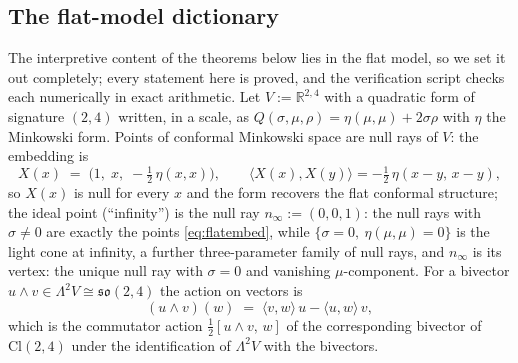 \documentclass[11pt]{article}
\theoremstyle{definition}
\newcommand{\Cl}{\mathrm{Cl}}
\newcommand{\R}{\mathbb{R}}
\newcommand{\nInf}{n_\infty}
\newcommand{\ip}[2]{\langle #1, #2\rangle}
\begin{document}
\subsection{The flat-model dictionary}\label{subsec:flatmodel}

The interpretive content of the theorems below lies in the flat model, so we set it out completely; every statement here is proved, and the verification script checks each numerically in exact arithmetic. Let $V := \R^{2,4}$ with a quadratic form of signature $(2,4)$ written, in a scale, as $Q(\sigma,\mu,\rho) = \eta(\mu,\mu) + 2\sigma\rho$ with $\eta$ the Minkowski form. Points of conformal Minkowski space are null rays of $V$: the embedding is
\begin{equation}\label{eq:flatembed}
X(x) \;=\; \bigl(1,\; x,\; -\tfrac12\,\eta(x,x)\bigr), \qquad
\ip{X(x)}{X(y)} = -\tfrac12\,\eta(x - y,\, x - y),
\end{equation}
so $X(x)$ is null for every $x$ and the form recovers the flat conformal structure; the ideal point (``infinity'') is the null ray $\nInf := (0, 0, 1)$: the null rays with $\sigma \neq 0$ are exactly the points \eqref{eq:flatembed}, while $\{\sigma = 0,\ \eta(\mu,\mu) = 0\}$ is the light cone at infinity, a further three-parameter family of null rays, and $\nInf$ is its vertex: the unique null ray with $\sigma = 0$ and vanishing $\mu$-component. For a bivector $u \wedge v \in \Lambda^2 V \cong \mathfrak{so}(2,4)$ the action on vectors is
\begin{equation}\label{eq:bivectoraction}
(u \wedge v)(w) \;=\; \ip{v}{w}\,u - \ip{u}{w}\,v ,
\end{equation}
which is the commutator action $\tfrac12[u\wedge v,\, w]$ of the corresponding bivector of $\Cl(2,4)$ under the identification of $\Lambda^2 V$ with the bivectors.
\end{document}
